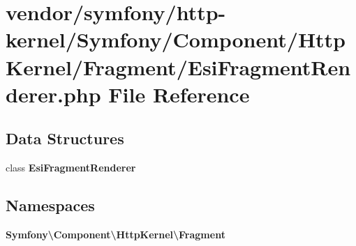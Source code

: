 \section{vendor/symfony/http-\/kernel/\+Symfony/\+Component/\+Http\+Kernel/\+Fragment/\+Esi\+Fragment\+Renderer.php File Reference}
\label{_esi_fragment_renderer_8php}
\subsection*{Data Structures}
\begin{DoxyCompactItemize}
\item 
class {\bf Esi\+Fragment\+Renderer}
\end{DoxyCompactItemize}
\subsection*{Namespaces}
\begin{DoxyCompactItemize}
\item 
 {\bf Symfony\textbackslash{}\+Component\textbackslash{}\+Http\+Kernel\textbackslash{}\+Fragment}
\end{DoxyCompactItemize}

